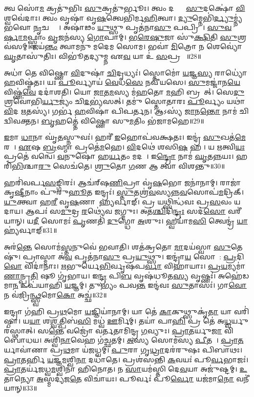 𑌤𑍍𑌵 𑌸𑍋॑\ul{𑌮} 𑌕𑍍𑌰𑌤𑍁॑𑌭𑌿𑌃 \ul{𑌸𑍁}𑌕𑍍𑌰𑌤𑍁॑𑌰𑍍𑌭𑍂𑌃।
𑌤𑍍𑌵𑌂 𑌦𑌕𑍍𑌷𑍈𑌃᳚ \ul{𑌸𑍁}𑌦𑌕𑍍𑌷𑍋॑ \ul{𑌵𑌿}𑌶𑍍𑌵𑌵𑍇॑𑌦𑌾𑌃।
𑌤𑍍𑌵𑌂 𑌵𑍃𑌷𑌾॑ 𑌵𑍃\ul{𑌷}𑌤𑍍𑌵𑍇𑌭𑌿॑𑌰𑍍𑌮\ul{𑌹𑌿}𑌤𑍍𑌵𑌾।
\ul{𑌦𑍍𑌯𑍁}𑌮𑍍𑌨𑍇𑌭𑌿॑\ul{𑌰𑍍𑌦𑍍𑌯𑍁}𑌮𑍍𑌨𑍍𑌯॑𑌭𑌵𑍋 \ul{𑌨𑍃}𑌚𑌕𑍍𑌷𑌾𑌃᳚।
𑌅𑌷𑌾॑𑌢𑌂 \ul{𑌯𑍁}𑌥𑍍𑌸𑍁 𑌪𑍃𑌤॑𑌨𑌾\ul{𑌸𑍁} 𑌪𑌪𑍍𑌰𑌿𑌮𑍍᳚।
\ul{𑌸𑍁}\ul{𑌵}\ul{𑌰𑍍}𑌷𑌾\ul{𑌮}𑌫𑍍𑌸𑍍𑌵𑌾𑌂 \ul{𑌵𑍃}𑌜𑌨॑𑌸𑍍𑌯 \ul{𑌗𑍋}𑌪𑌾𑌮𑍍।
\ul{𑌭}\ul{𑌰𑍇}\ul{𑌷𑍁}𑌜𑌾 𑌸𑍁॑\ul{𑌕𑍍𑌷𑌿}𑌤𑌿 \ul{𑌸𑍁}𑌶𑍍𑌰𑌵॑𑌸𑌮𑍍।
𑌜𑌯॑\ul{𑌨𑍍𑌤𑌂} 𑌤𑍍𑌵𑌾𑌮𑌨𑍁॑ 𑌮𑌦𑍇𑌮 𑌸𑍋𑌮।
𑌭𑌵𑌾॑ \ul{𑌮𑌿}𑌤𑍍𑌰𑍋 𑌨 𑌶𑍇𑌵𑍍𑌯𑍋॑ \ul{𑌘𑍃}𑌤𑌾𑌸𑍁॑𑌤𑌿𑌃।
𑌵𑌿𑌭𑍂॑𑌤𑌦𑍍𑌯𑍁𑌮𑍍𑌨 𑌏\ul{𑌵} 𑌯𑌾 𑌉॑ \ul{𑌸}𑌪𑍍𑌰𑌥𑌾𑌃᳚॥28॥

𑌅𑌧𑌾॑ 𑌤𑍇 𑌵𑌿𑌷𑍍𑌣𑍋 \ul{𑌵𑌿}𑌦𑍁𑌷𑌾॑ \ul{𑌚𑌿}𑌦𑍃𑌧𑍍𑌯𑌃॑।
𑌸𑍍𑌤𑍋𑌮𑍋॑ \ul{𑌯}𑌜𑍍𑌞\ul{𑌸𑍍𑌯} 𑌰𑌾𑌧𑍍𑌯𑍋॑ \ul{𑌹}𑌵𑌿𑌷𑍍𑌮॑𑌤𑌃।
𑌯𑌃 \ul{𑌪𑍂}𑌰𑍍𑌵𑍍𑌯𑌾𑌯॑ \ul{𑌵𑍇}𑌧\ul{𑌸𑍇} 𑌨𑌵𑍀॑𑌯𑌸𑍇।
\ul{𑌸𑍁}𑌮𑌜𑍍𑌜𑌾॑𑌨\ul{𑌯𑍇} 𑌵𑌿𑌷𑍍𑌣॑\ul{𑌵𑍇} 𑌦𑌦𑌾॑𑌶𑌤𑌿।
𑌯𑍋 \ul{𑌜𑌾}𑌤\ul{𑌮}𑌸𑍍𑌯 𑌮॑\ul{𑌹}𑌤𑍋 \ul{𑌮}𑌹𑌿 𑌬𑍍𑌰𑌵𑌾᳚𑌤𑍍।
𑌸𑍇\ul{𑌦𑍁} 𑌶𑍍𑌰𑌵𑍋॑𑌭𑌿\ul{𑌰𑍍𑌯𑍁}𑌜𑍍𑌯𑌂॑         𑌚𑌿\ul{𑌦}𑌭𑍍𑌯॑𑌸𑌤𑍍।
𑌤𑌮𑍁॑ 𑌸𑍍𑌤𑍋𑌤𑌾𑌰𑌃 \ul{𑌪𑍂}𑌰𑍍𑌵𑍍𑌯𑌂 𑌯𑌥𑌾॑ \ul{𑌵𑌿}𑌦 \ul{𑌋}𑌤𑌸𑍍𑌯॑।
𑌗𑌰𑍍𑌭॑ \ul{𑌹}𑌵𑌿𑌷𑌾॑ 𑌪𑌿𑌪𑌰𑍍𑌤𑌨।
𑌆𑌽𑌸𑍍𑌯॑ \ul{𑌜𑌾}𑌨\ul{𑌨𑍍𑌤𑍋} 𑌨𑌾𑌮॑ 𑌚𑌿𑌦𑍍𑌵𑌿𑌵𑌕𑍍𑌤𑌨।
\ul{𑌬𑍃}𑌹𑌤𑍍𑌤𑍇॑ 𑌵𑌿𑌷𑍍𑌣𑍋 𑌸𑍁\ul{𑌮}𑌤𑌿𑌂 𑌭॑𑌜𑌾𑌮𑌹𑍇॥29॥

\ul{𑌇}𑌮𑌾 \ul{𑌧𑌾}𑌨𑌾 𑌘𑍃॑\ul{𑌤}𑌸𑍍𑌨𑍁𑌵𑌃॑।
𑌹𑌰𑍀॑ \ul{𑌇}𑌹𑍋𑌪॑𑌵𑌕𑍍𑌷𑌤𑌃।
𑌇𑌨𑍍𑌦𑍍𑌰॑ \ul{𑌸𑍁}𑌖𑌤॑\ul{𑌮𑍇} 𑌰𑌥𑍇᳚।
\ul{𑌏}𑌷 \ul{𑌬𑍍𑌰}𑌹𑍍𑌮𑌾 𑌪𑍍𑌰𑌤𑍇॑\ul{𑌮}𑌹𑍇।
\ul{𑌵𑌿}𑌦𑌥𑍇॑ 𑌶𑌸𑌿\ul{𑌷}\ul{} 𑌹𑌰𑍀᳚।
𑌯 \ul{𑌋}𑌤𑍍𑌵𑌿\ul{𑌯𑌃} 𑌪𑍍𑌰𑌤𑍇॑ 𑌵𑌨𑍍𑌵𑍇।
\ul{𑌵}𑌨𑍁𑌷𑍋॑ 𑌹\ul{𑌰𑍍𑌯}𑌤𑌂 𑌮𑌦𑌮𑍍᳚।
𑌇\ul{𑌨𑍍𑌦𑍍𑌰𑍋} 𑌨𑌾𑌮॑ \ul{𑌘𑍃}𑌤𑌨𑍍𑌨𑌯𑌃।
𑌹𑌰𑌿॑\ul{𑌭𑌿}𑌶𑍍𑌚𑌾\ul{𑌰𑍁} 𑌸𑍇𑌚॑𑌤𑍇।
\ul{𑌶𑍍𑌰𑍁}𑌤𑍋 \ul{𑌗}𑌣 𑌆 𑌤𑍍𑌵𑌾॑ 𑌵𑌿𑌶𑌨𑍍𑌤𑍁॥30॥

𑌹𑌰𑌿॑𑌵𑌰𑍍𑌪\ul{𑌸}𑌙𑍍𑌗𑌿𑌰𑌃॑।
𑌆𑌚॑𑌰𑍍‌\mbox{}𑌷\ul{𑌣𑌿}𑌪𑍍𑌰𑌾 𑌵𑍃॑\ul{𑌷}𑌭𑍋 𑌜𑌨𑌾॑𑌨𑌾𑌮𑍍।
𑌰𑌾𑌜𑌾॑ 𑌕𑍃\ul{𑌷𑍍𑌟𑍀}𑌨𑌾𑌂 𑌪𑍁॑𑌰𑍁\ul{𑌹𑍂}𑌤 𑌇𑌨𑍍𑌦𑍍𑌰𑌃॑।
\ul{𑌸𑍍𑌤𑍁}𑌤𑌶𑍍𑌰॑\ul{𑌵}𑌸𑍍𑌯𑌨𑍍𑌨\ul{𑌵}𑌸𑍋𑌪॑\ul{𑌮}𑌦𑍍𑌰𑌿𑌕𑍍।
\ul{𑌯𑍁}𑌕𑍍𑌤𑍍𑌵𑌾 𑌹\ul{𑌰𑍀} 𑌵𑍃\ul{𑌷}𑌣𑌾𑌯𑌾᳚\ul{𑌹𑍍𑌯}𑌰𑍍𑌵𑌾𑌙𑍍।
𑌪𑍍𑌰 𑌯𑌥𑍍𑌸𑌿𑌨𑍍𑌧॑𑌵𑌃 𑌪𑍍𑌰\ul{𑌸}𑌵𑌂 𑌯𑌦𑌾𑌯\sn{}।
𑌆𑌪𑌃॑ 𑌸\ul{𑌮𑍁}𑌦𑍍𑌰 \ul{𑌰}𑌥𑍍𑌯𑍇॑𑌵 𑌜𑌗𑍍𑌮𑍁𑌃।
𑌅𑌤॑\ul{𑌶𑍍𑌚𑌿}𑌦𑌿\ul{𑌨𑍍𑌦𑍍𑌰𑌃} 𑌸𑌦॑\ul{𑌸𑍋} 𑌵𑌰𑍀॑𑌯𑌾𑌨𑍍।
𑌯\ul{𑌦𑍀}\ul{} 𑌸𑍋𑌮𑌃॑ \ul{𑌪𑍃}𑌣𑌤𑌿॑ \ul{𑌦𑍁}𑌗𑍍𑌧𑍋 \ul{𑌅}\ul{}𑌶𑍁𑌃।
𑌹𑍍𑌵𑌯𑌾॑𑌮\ul{𑌸𑌿} 𑌤𑍍𑌵𑍇𑌨𑍍𑌦𑍍𑌰॑ \ul{𑌯𑌾}𑌹𑍍𑌯॑𑌰𑍍𑌵𑌾𑌙𑍍॥31॥

𑌅𑌰॑\ul{𑌨𑍍𑌤𑍇} 𑌸𑍋𑌮॑\ul{𑌸𑍍𑌤}𑌨𑍁𑌵𑍇॑ 𑌭𑌵𑌾𑌤𑌿।
𑌶𑌤॑𑌕𑍍𑌰𑌤𑍋 \ul{𑌮𑌾}𑌦𑌯॑𑌸𑍍𑌵𑌾 \ul{𑌸𑍁}𑌤𑍇𑌷𑍁॑।
𑌪𑍍𑌰𑌾𑌸𑍍𑌮𑌾 𑌅॑\ul{𑌵} 𑌪𑍃𑌤॑𑌨𑌾\ul{𑌸𑍁} 𑌪𑍍𑌰\ul{𑌯𑍁}𑌥𑍍𑌸𑍁।
𑌇𑌨𑍍𑌦𑍍𑌰𑌾॑\ul{𑌯} 𑌸𑍋𑌮𑌾᳚: \ul{𑌪𑍍𑌰}𑌦𑌿\ul{𑌵𑍋} 𑌵𑌿𑌦𑌾॑𑌨𑌾𑌃।
\ul{𑌋}𑌭𑍁𑌰𑍍𑌯𑍇\ul{𑌭𑌿}𑌰𑍍𑌵𑍃𑌷॑𑌪\ul{𑌰𑍍𑌵𑌾} 𑌵𑌿𑌹𑌾॑𑌯𑌾𑌃।
\ul{𑌪𑍍𑌰}\ul{𑌯}𑌮𑍍𑌯𑌮𑌾॑\ul{𑌣𑌾}𑌨𑍍𑌪𑍍𑌰\ul{𑌤𑌿} 𑌷𑍂 𑌗𑍃॑𑌭𑌾𑌯।
𑌇\ul{𑌨𑍍𑌦𑍍𑌰} 𑌪𑌿\ul{𑌬} 𑌵𑍃𑌷॑𑌧𑍂𑌤\ul{𑌸𑍍𑌯} 𑌵𑍃𑌷𑍍𑌣𑌃॑।
𑌅𑌹𑍇॑𑌡𑌮𑌾\ul{𑌨} 𑌉𑌪॑𑌯𑌾𑌹𑌿 \ul{𑌯}𑌜𑍍𑌞𑌮𑍍।
𑌤𑍁𑌭𑍍𑌯𑌂॑ 𑌪𑌵\ul{𑌨𑍍𑌤} 𑌇𑌨𑍍𑌦॑𑌵𑌃 \ul{𑌸𑍁}𑌤𑌾𑌸𑌃॑।
𑌗𑌾\ul{𑌵𑍋} 𑌨 𑌵॑𑌜𑍍𑌰𑌿\ul{𑌨𑍍𑌥𑍍𑌸𑍍𑌵}𑌮𑍋\ul{𑌕𑍋} 𑌅𑌚𑍍𑌛॑॥32॥

𑌇𑌨𑍍𑌦𑍍𑌰𑌾 𑌗॑𑌹𑌿 𑌪𑍍𑌰\ul{𑌥}𑌮𑍋 \ul{𑌯}𑌜𑍍𑌞𑌿𑌯𑌾॑𑌨𑌾𑌮𑍍।
𑌯𑌾 𑌤𑍇॑ \ul{𑌕𑌾}𑌕𑍁𑌥𑍍𑌸𑍁𑌕𑍃॑\ul{𑌤𑌾} 𑌯𑌾 𑌵𑌰𑌿॑𑌷𑍍𑌠𑌾।
𑌯\ul{𑌯𑌾} 𑌶\ul{𑌶𑍍𑌵}𑌤𑍍𑌪𑌿𑌬॑\ul{𑌸𑌿} 𑌮𑌧𑍍𑌵॑ \ul{𑌊}𑌰𑍍𑌮𑌿𑌮𑍍।
𑌤𑌯𑌾॑ 𑌪𑌾\ul{𑌹𑌿} 𑌪𑍍𑌰 𑌤𑍇॑ 𑌅\ul{𑌧𑍍𑌵}𑌰𑍍𑌯𑍁𑌰॑𑌸𑍍𑌥𑌾𑌤𑍍।
𑌸\ul{𑌨𑍍𑌤𑍇} 𑌵𑌜𑍍𑌰𑍋॑ 𑌵𑌰𑍍𑌤𑌤𑌾𑌮𑌿𑌨𑍍𑌦𑍍𑌰 \ul{𑌗}𑌵𑍍𑌯𑍁𑌃।
\ul{𑌪𑍍𑌰𑌾}\ul{𑌤}𑌰𑍍𑌯𑍁\ul{𑌜𑌾} 𑌵𑌿 𑌬𑍋॑𑌧𑌯।
𑌅𑌶𑍍𑌵𑌿॑\ul{𑌨𑌾}𑌵𑍇𑌹 𑌗॑𑌚𑍍𑌛𑌤𑌮𑍍।
\ul{𑌅}𑌸𑍍𑌯 𑌸𑍋𑌮॑𑌸𑍍𑌯 \ul{𑌪𑍀}𑌤𑌯𑍇᳚।
\ul{𑌪𑍍𑌰𑌾}\ul{𑌤}𑌰𑍍𑌯𑌾𑌵𑌾॑𑌣𑌾 𑌪𑍍𑌰\ul{𑌥}𑌮𑌾 𑌯॑𑌜𑌧𑍍𑌵𑌮𑍍।
\ul{𑌪𑍁}𑌰𑌾 𑌗𑍃\ul{𑌧𑍍𑌰𑌾}𑌦𑌰॑𑌰𑍁𑌷𑌃 𑌪𑌿𑌬𑌾𑌥𑌃।
\ul{𑌪𑍍𑌰𑌾}𑌤𑌰𑍍\mbox{}𑌹𑌿 \ul{𑌯}𑌜𑍍𑌞\ul{𑌮}𑌶𑍍𑌵𑌿\ul{𑌨𑌾} 𑌦𑌧𑌾॑𑌤𑍇।
𑌪𑍍𑌰𑌶॑𑌸𑌨𑍍𑌤𑌿 \ul{𑌕}𑌵𑌯𑌃॑ 𑌪𑍂\ul{𑌰𑍍𑌵}𑌭𑌾𑌜𑌃॑।
\ul{𑌪𑍍𑌰𑌾}𑌤𑌰𑍍𑌯॑𑌜𑌧𑍍𑌵\ul{𑌮}𑌶𑍍𑌵𑌿𑌨𑌾॑ 𑌹𑌿𑌨𑍋𑌤।
𑌨 \ul{𑌸𑌾}𑌯𑌮॑𑌸𑍍𑌤𑌿 𑌦𑍇\ul{𑌵}𑌯𑌾 𑌅𑌜𑍁॑𑌷𑍍𑌟𑌮𑍍।
\ul{𑌉}𑌤𑌾𑌨𑍍𑌯𑍋 \ul{𑌅}𑌸𑍍𑌮𑌦𑍍𑌯॑𑌜\ul{𑌤𑍇} 𑌵𑌿𑌚𑌾॑𑌯𑌃।
𑌪𑍂𑌰𑍍𑌵𑌃॑ 𑌪𑍂\ul{𑌰𑍍𑌵𑍋} 𑌯𑌜॑𑌮𑌾\ul{𑌨𑍋} 𑌵𑌨𑍀॑𑌯𑌾𑌨𑍍॥33॥\anuvakamend[\ul{𑌚𑌾}\ul{𑌶𑍍𑌵}𑌜𑌿𑌦𑍍𑌯𑍋 𑌗॑𑌚𑍍𑌛𑌤𑌂 \ul{𑌨𑍋} 𑌦𑌾\ul{𑌶}𑌨𑍍𑌨𑌾𑌮𑌾॑\ul{𑌭𑌿}𑌶𑍍𑌰𑍀𑌰𑍍𑌗॑𑌮𑍇𑌮 \ul{𑌸}𑌪𑍍𑌰𑌥𑌾॑ 𑌭𑌜𑌾𑌮𑌹𑍇 𑌵𑌿𑌶𑌨𑍍𑌤𑍁 \ul{𑌯𑌾}𑌹𑍍𑌯॑𑌰𑍍𑌵𑌾𑌙𑌚𑍍𑌛॑ 𑌪𑌿𑌬𑌾\ul{𑌥𑌃} 𑌷𑌟𑍍𑌚॑]

